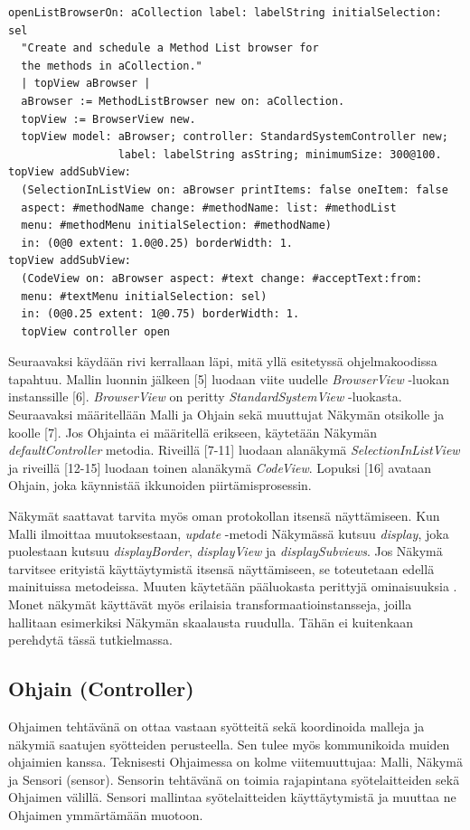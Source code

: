 \documentclass[utf8]{gradu3}
\begin{document}
\begin{lstlisting}[language=Smalltalk]
openListBrowserOn: aCollection label: labelString initialSelection: sel
  "Create and schedule a Method List browser for 
  the methods in aCollection."
  | topView aBrowser | 
  aBrowser := MethodListBrowser new on: aCollection.
  topView := BrowserView new.
  topView model: aBrowser; controller: StandardSystemController new;
                 label: labelString asString; minimumSize: 300@100.
topView addSubView:
  (SelectionInListView on: aBrowser printItems: false oneItem: false
  aspect: #methodName change: #methodName: list: #methodList
  menu: #methodMenu initialSelection: #methodName)
  in: (0@0 extent: 1.0@0.25) borderWidth: 1.
topView addSubView:
  (CodeView on: aBrowser aspect: #text change: #acceptText:from:
  menu: #textMenu initialSelection: sel)
  in: (0@0.25 extent: 1@0.75) borderWidth: 1.
  topView controller open
\end{lstlisting}

Seuraavaksi käydään rivi kerrallaan läpi, mitä yllä esitetyssä ohjelmakoodissa tapahtuu. Mallin luonnin jälkeen [5] luodaan viite uudelle \textit{BrowserView} -luokan instanssille [6]. \textit{BrowserView} on peritty \textit{StandardSystemView} -luokasta. Seuraavaksi määritellään Malli ja Ohjain sekä muuttujat Näkymän otsikolle ja koolle [7]. Jos Ohjainta ei määritellä erikseen, käytetään Näkymän \textit{defaultController} metodia. Riveillä [7-11] luodaan alanäkymä \textit{SelectionInListView} ja riveillä [12-15] luodaan toinen alanäkymä \textit{CodeView}. Lopuksi [16] avataan Ohjain, joka käynnistää ikkunoiden piirtämisprosessin.

Näkymät saattavat tarvita myös oman protokollan itsensä näyttämiseen. Kun Malli ilmoittaa muutoksestaan, \textit{update} -metodi Näkymässä kutsuu \textit{display}, joka puolestaan kutsuu \textit{displayBorder}, \textit{displayView} ja \textit{displaySubviews}. Jos Näkymä tarvitsee erityistä käyttäytymistä itsensä näyttämiseen, se toteutetaan edellä mainituissa metodeissa. Muuten käytetään pääluokasta perittyjä ominaisuuksia \parencite{burbeck}. Monet näkymät käyttävät myös erilaisia transformaatioinstansseja, joilla hallitaan esimerkiksi Näkymän skaalausta ruudulla. Tähän ei kuitenkaan perehdytä tässä tutkielmassa.

\subsection{Ohjain (Controller)}
Ohjaimen tehtävänä on ottaa vastaan syötteitä sekä koordinoida malleja ja näkymiä saatujen syötteiden perusteella. Sen tulee myös kommunikoida muiden ohjaimien kanssa. Teknisesti Ohjaimessa on kolme viitemuuttujaa: Malli, Näkymä ja Sensori (sensor). Sensorin tehtävänä on toimia rajapintana syötelaitteiden sekä Ohjaimen välillä. Sensori mallintaa syötelaitteiden käyttäytymistä ja muuttaa ne Ohjaimen ymmärtämään muotoon.
\end{document}
